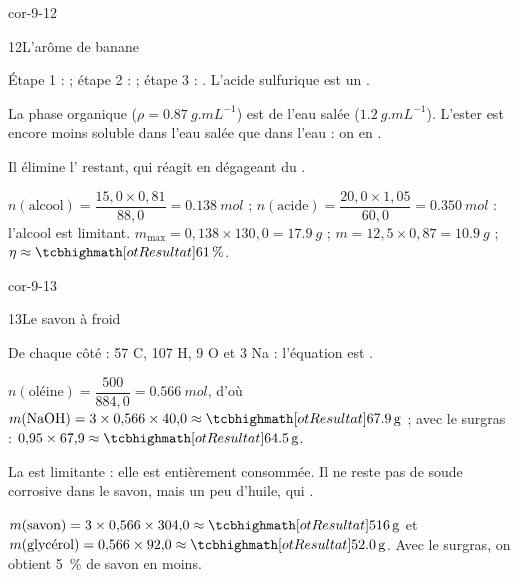 \begin{blocLivre}{cor-9-12}
\begin{corrige}{12}{L'arôme de banane}
\begin{questions}
\item Étape 1 :  ; étape 2 :  ; étape 3 : . L'acide sulfurique est un
.
\item La phase organique ($\rho=\qty{0,87}{g.mL^{-1}}$) est  de l'eau salée ($\qty{1,2}{g.mL^{-1}}$). L'ester est encore moins
soluble dans l'eau salée que dans l'eau : on en .
\item Il élimine l' restant, qui réagit en dégageant du .
\item $n(\text{alcool})=\dfrac{15{,}0\times0{,}81}{88{,}0}=\qty{0,138}{mol}$ ; $n(\text{acide})=\dfrac{20{,}0\times1{,}05}{60{,}0}=\qty{0,350}{mol}$ : l'alcool est limitant.
$m_\text{max}=0{,}138\times130{,}0=\qty{17,9}{g}$ ; $m=12{,}5\times0{,}87=\qty{10,9}{g}$ ; $\eta\approx\res{\qty{61}{\percent}}$.
\end{questions}
\end{corrige}
\end{blocLivre}
\begin{blocLivre}{cor-9-13}
\begin{corrige}{13}{Le savon à froid}
\begin{questions}
\item De chaque côté : 57 C, 107 H, 9 O et 3 Na : l'équation est .
\item $n(\text{oléine})=\dfrac{500}{884{,}0}=\qty{0,566}{mol}$, d'où $m(\ce{NaOH})=3\times0{,}566\times40{,}0\approx\res{\qty{67,9}{g}}$ ; avec le surgras :
$0{,}95\times67{,}9\approx\res{\qty{64,5}{g}}$.
\item La  est limitante : elle est entièrement consommée. Il ne reste pas de soude corrosive dans le savon, mais un
peu d'huile, qui .
\item $m(\text{savon})=3\times0{,}566\times304{,}0\approx\res{\qty{516}{g}}$ et $m(\text{glycérol})=0{,}566\times92{,}0\approx\res{\qty{52,0}{g}}$. Avec le surgras, on obtient
\qty{5}{\percent} de savon en moins.
\end{questions}
\end{corrige}
\end{blocLivre}
